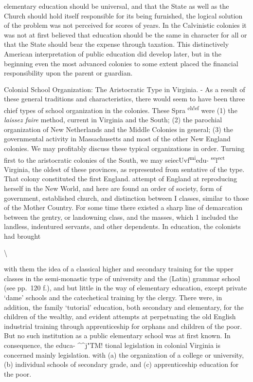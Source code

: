 \documentclass[
]{book}
\begin{document}
elementary education should be universal, and that the State as well as the Church should hold itself responsible for its being furnished, the logical solution of the problem was not perceived for scores of years. In the Calvinistic colonies it was not at first believed that education should be the same in character for all or that the State should bear the expense through taxation. This distinctively American interpretation of public education did develop later, but in the beginning even the most advanced colonies to some extent placed the financial responsibility upon the parent or guardian.

Colonial School Organization: The Aristocratic Type in Virginia. - As a result of these general traditions and characteristics, there would seem to have been three chief types of school organization in the colonies. These Spra \textsuperscript{ch!ef} were (1) the \emph{laissez faire} method, current in Virginia and the South; (2) the parochial organization of New Netherlands and the Middle Colonies in general; (3) the governmental activity in Massachusetts and most of the other New England colonies. We may profitably discuss these typical organizations in order. Turning first to the aristocratic colonies of the South, we may seiecUvf\textsuperscript{mi}edu- \textsuperscript{se}l\textsuperscript{ect} Virginia, the oldest of these provinces, as represented from sentative of the type. That colony constituted the first England. attempt of England at reproducing herself in the New World, and here are found an order of society, form of government, established church, and distinction between I classes, similar to those of the Mother Country. For some time there existed a sharp line of demarcation between the gentry, or landowning class, and the masses, which 1 included the landless, indentured servants, and other dependents. In education, the colonists had brought

\textbackslash{}

with them the idea of a classical higher and secondary training for the upper classes in the semi-monastic type of university and the (Latin) grammar school (see pp.~120 f.), and but little in the way of elementary education, except private `dame' schools and the catechetical training by the clergy. There were, in addition, the family `tutorial' education, both secondary and elementary, for the children of the wealthy, and evident attempts at perpetuating the old English industrial training through apprenticeship for orphans and children of the poor. But no such institution as a public elementary school was at first known. In consequence, the educa- \^{}\^{}j"TM! tional legislation in colonial Virginia is concerned mainly legislation. with (a) the organization of a college or university, (b) individual schools of secondary grade, and (c) apprenticeship education for the poor.
\end{document}
